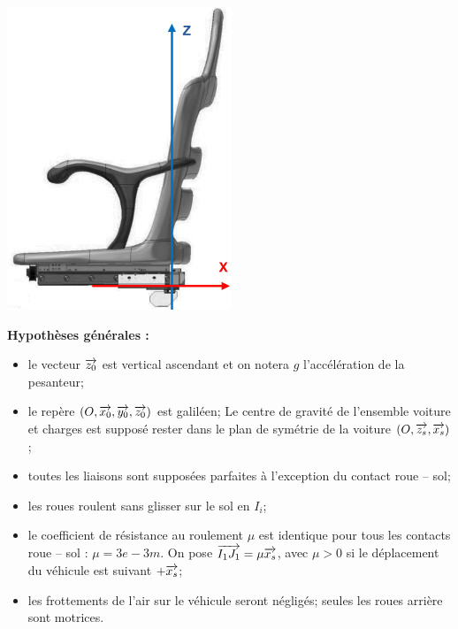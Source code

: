 \documentclass[10pt,fleqn]{article} %
\begin{document}
\begin{multicols}{2}
\begin{center}
\includegraphics[width=\linewidth]{images/fig_02}
\end{center}


\textbf{Hypothèses générales : }
\begin{itemize}
\item le vecteur $\overrightarrow{z_0}$ est vertical ascendant et on notera $g$ l'accélération de la pesanteur;
\item le repère $\left({O},\overrightarrow{x_0},\overrightarrow{y_0},\overrightarrow{z_0}\right)$ est galiléen;
Le centre de gravité de l’ensemble voiture et charges est supposé rester dans le
plan de symétrie de la voiture $\left(O,\overrightarrow{z_s},\overrightarrow{x_s}\right)$;
\item toutes les liaisons sont supposées parfaites à l’exception du contact roue -- sol;
\item les roues roulent sans glisser sur le sol en $I_i$;
\item le coefficient de résistance au roulement $\mu$ est identique pour tous les contacts
roue -- sol : $\mu = \si{3e-3}{m}$. On pose $\overrightarrow{I_1J_1}=\mu \overrightarrow{x_s}$, avec $\mu >0$
si le déplacement du véhicule est suivant $+\overrightarrow{x_s}$;
\item les frottements de l’air sur le véhicule seront négligés;
seules les roues arrière sont motrices.
\end{itemize}


\end{multicols}
\end{document}

